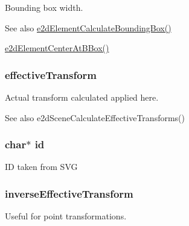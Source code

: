 Bounding box width. \begin{DoxySeeAlso}{See also}
\hyperlink{group__e2dElement_ga94aa710b2da71af2091fe4d5b87ce47e}{e2d\-Element\-Calculate\-Bounding\-Box()} 

\hyperlink{group__e2dElement_ga36b01a888c97163c990e16d348aff61c}{e2d\-Element\-Center\-At\-B\-Box()} 
\end{DoxySeeAlso}
\hypertarget{structe2dElement_a6c8e26945f09b5157e2111e42f99b879}{
\subsubsection[{effective\-Transform}]{ {\bf effective\-Transform}}}\label{structe2dElement_a6c8e26945f09b5157e2111e42f99b879}
Actual transform calculated applied here. \begin{DoxySeeAlso}{See also}
e2d\-Scene\-Calculate\-Effective\-Transforms() 
\end{DoxySeeAlso}
\hypertarget{structe2dElement_aecb3b0d045ada529257a2fbf8f829599}{
\subsubsection[{id}]{\setlength{\rightskip}{0pt plus 5cm}char$\ast$ {\bf id}}}\label{structe2dElement_aecb3b0d045ada529257a2fbf8f829599}
I\-D taken from S\-V\-G \hypertarget{structe2dElement_a5e6d7341f2dbef1923b0a3fcc13781c6}{
\subsubsection[{inverse\-Effective\-Transform}]{ {\bf inverse\-Effective\-Transform}}}\label{structe2dElement_a5e6d7341f2dbef1923b0a3fcc13781c6}
Useful for point transformations.

